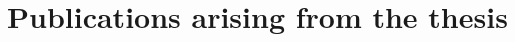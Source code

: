 \chapter*{Publications arising from the thesis}

\bigskip

\begin{refsection}
\nocite{Cutoff2022,parareal2022}

\printbibliography[heading = none]
\end{refsection}
